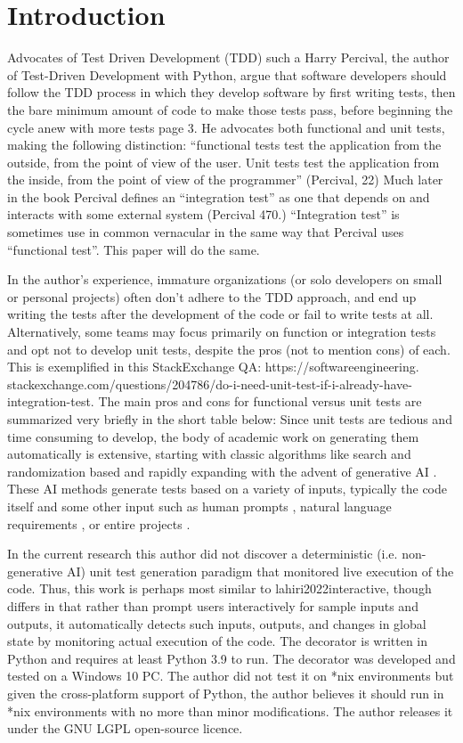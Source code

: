 \section{Introduction}\label{sec:introduction}
Advocates of Test Driven Development (TDD) such a Harry Percival,
the author of Test-Driven Development with Python,
argue that software developers should follow the TDD process in
which they develop software by first writing tests,
then the bare minimum amount of code to make those tests pass,
before beginning the cycle anew with more tests \cite{percival2014test} page 3.
%
He advocates both functional and unit tests, making the following distinction:
“functional tests test the application from the outside, from the point of view
of the user.
%
Unit tests test the application from the inside,
from the point of view of the programmer” (Percival, 22)
%
Much later in the book Percival defines an “integration test” as
one that depends on and interacts with some external system (Percival 470.)
%
“Integration test” is sometimes use in common vernacular in the same way that
Percival uses “functional test”.
%
This paper will do the same.

In the author’s experience, immature organizations (or solo developers
on small or personal projects) often don’t adhere to the TDD approach,
and end up writing the tests after the development of the code or
fail to write tests at all.
%
Alternatively, some teams may focus primarily on function or integration tests
and opt not to develop unit tests, despite the pros (not to mention cons) of
each.
%
This is exemplified in this StackExchange QA: https://softwareengineering.
%
stackexchange.com/questions/204786/do-i-need-unit-test-if-i-already-have-integration-test.
%
The main pros and cons for functional versus unit tests are summarized very
briefly in the short table below:
%
Since unit tests are tedious and time consuming to develop, the body of academic
work on generating them automatically is extensive, starting with classic
algorithms like search and randomization based \cite{Luk22Pynguin0170} and
rapidly expanding with the advent of generative AI 
\cite{bhatia2023unit,takerngsaksiri2024tdd,wang2024software}.
%
These AI methods generate tests based on a variety of inputs, typically the code
itself and some other input such as human prompts \cite{lahiri2022interactive},
natural language requirements \cite{wang2024software}, or entire projects
\cite{rao2023cat}.

In the current research this author did not discover a deterministic (i.e.
non-generative AI) unit test generation paradigm that monitored live execution
of the code.
%
Thus, this work is perhaps most similar to lahiri2022interactive, though
differs in that rather than prompt users interactively for sample inputs and
outputs, it automatically detects such inputs, outputs, and changes in global
state by monitoring actual execution of the code.
%
The decorator is written in Python and requires at least Python 3.9 to run.
%
The decorator was developed and tested on a Windows 10 PC.  The author 
did not test it on *nix environments but given the cross-platform support of
Python, the author believes it should run in *nix environments with no more than
minor modifications.
%
The author releases it under the GNU LGPL open-source licence.
